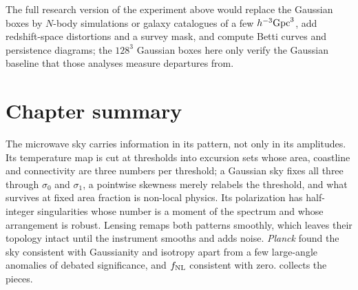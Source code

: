 The full research version of the experiment above would replace the Gaussian boxes by $N$-body simulations or galaxy catalogues of a few $h^{-3}{\rm Gpc}^3$, add redshift-space distortions and a survey mask, and compute Betti curves and persistence diagrams; the $128^3$ Gaussian boxes here only verify the Gaussian baseline that those analyses measure departures from.
\section*{Chapter summary}
\label{T3a:sec:summary}

The microwave sky carries information in its pattern, not only in its amplitudes. Its temperature map is cut at thresholds into excursion sets whose area, coastline and connectivity are three numbers per threshold; a Gaussian sky fixes all three through $\sigma_0$ and $\sigma_1$, a pointwise skewness merely relabels the threshold, and what survives at fixed area fraction is non-local physics. Its polarization has half-integer singularities whose number is a moment of the spectrum and whose arrangement is robust. Lensing remaps both patterns smoothly, which leaves their topology intact until the instrument smooths and adds noise. \textit{Planck} found the sky consistent with Gaussianity and isotropy apart from a few large-angle anomalies of debated significance, and $f_{\rm NL}$ consistent with zero.  collects the pieces.

